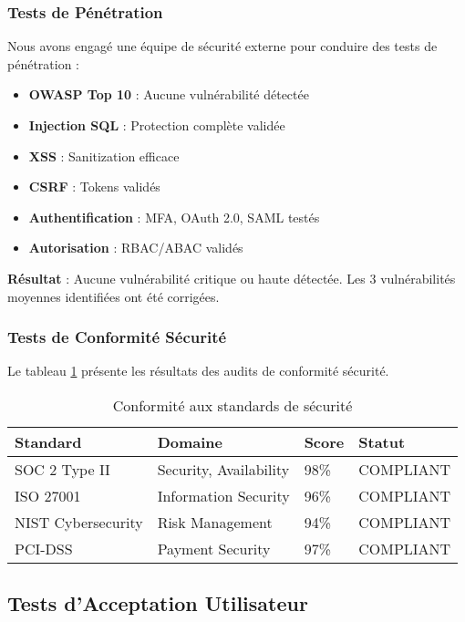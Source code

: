 \subsubsection{Tests de Pénétration}

Nous avons engagé une équipe de sécurité externe pour conduire des tests de pénétration :
\begin{itemize}
    \item \textbf{OWASP Top 10} : Aucune vulnérabilité détectée
    \item \textbf{Injection SQL} : Protection complète validée
    \item \textbf{XSS} : Sanitization efficace
    \item \textbf{CSRF} : Tokens validés
    \item \textbf{Authentification} : MFA, OAuth 2.0, SAML testés
    \item \textbf{Autorisation} : RBAC/ABAC validés
\end{itemize}

\textbf{Résultat} : Aucune vulnérabilité critique ou haute détectée. Les 3 vulnérabilités moyennes identifiées ont été corrigées.

\subsubsection{Tests de Conformité Sécurité}

Le tableau \ref{tab:conformite_securite} présente les résultats des audits de conformité sécurité.

\begin{table}[htpb]
\centering
\caption{Conformité aux standards de sécurité}
\label{tab:conformite_securite}
\begin{tabular}{|p{}|p{}|p{}|p{}|}
\hline
\textbf{Standard} & \textbf{Domaine} & \textbf{Score} & \textbf{Statut} \\
\hline
SOC 2 Type II & Security, Availability & 98\% & COMPLIANT \\
\hline
ISO 27001 & Information Security & 96\% & COMPLIANT \\
\hline
NIST Cybersecurity & Risk Management & 94\% & COMPLIANT \\
\hline
PCI-DSS & Payment Security & 97\% & COMPLIANT \\
\hline
\end{tabular}
\end{table}

\subsection{Tests d'Acceptation Utilisateur}

